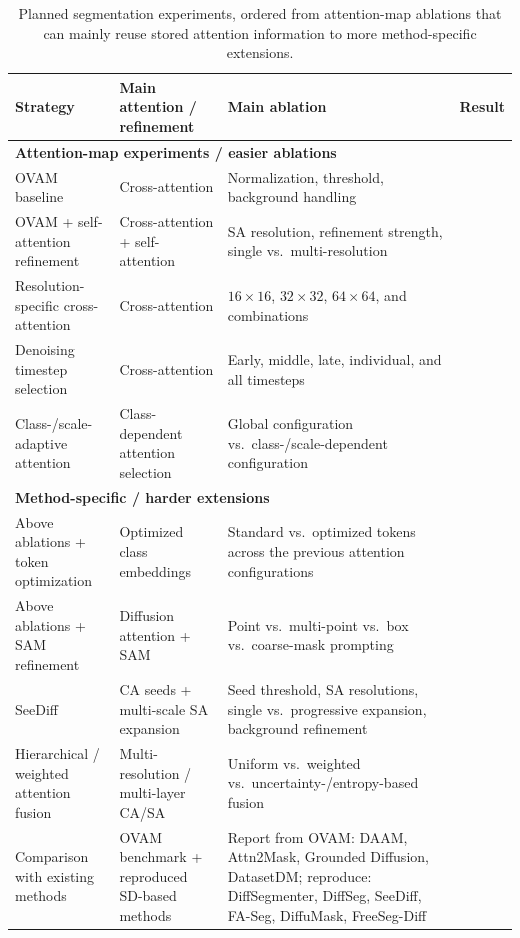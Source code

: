 \documentclass[11pt,a4paper]{article}
\begin{document}
\begin{table}[h]
\centering
\small
\begin{tabular}{p{3.2cm}p{3.0cm}p{3.6cm}p{2.1cm}}
\toprule
\textbf{Strategy} &
\textbf{Main attention / refinement} &
\textbf{Main ablation} &
\textbf{Result} \\
\midrule

\multicolumn{4}{l}{\textbf{Attention-map experiments / easier ablations}} \\
\midrule

OVAM baseline
& Cross-attention
& Normalization, threshold, background handling
& \\[1.2em]

OVAM + self-attention refinement
& Cross-attention + self-attention
& SA resolution, refinement strength, single vs.\ multi-resolution
& \\[1.2em]

Resolution-specific cross-attention
& Cross-attention
& $16\times16$, $32\times32$, $64\times64$, and combinations
& \\[1.2em]

Denoising timestep selection
& Cross-attention
& Early, middle, late, individual, and all timesteps
& \\[1.2em]

Class-/scale-adaptive attention
& Class-dependent attention selection
& Global configuration vs.\ class-/scale-dependent configuration
& \\[1.2em]

\midrule
\multicolumn{4}{l}{\textbf{Method-specific / harder extensions}} \\
\midrule

Above ablations + token optimization
& Optimized class embeddings
& Standard vs.\ optimized tokens across the previous attention configurations
& \\[1.2em]

Above ablations + SAM refinement
& Diffusion attention + SAM
& Point vs.\ multi-point vs.\ box vs.\ coarse-mask prompting
& \\[1.2em]

SeeDiff
& CA seeds + multi-scale SA expansion
& Seed threshold, SA resolutions, single vs.\ progressive expansion, background refinement
& \\[1.2em]

Hierarchical / weighted attention fusion
& Multi-resolution / multi-layer CA/SA
& Uniform vs.\ weighted vs.\ uncertainty-/entropy-based fusion
& \\[1.2em]

Comparison with existing methods
& OVAM benchmark + reproduced SD-based methods
& Report from OVAM: DAAM, Attn2Mask, Grounded Diffusion, DatasetDM; reproduce: DiffSegmenter, DiffSeg, SeeDiff, FA-Seg, DiffuMask, FreeSeg-Diff
& \\[1.2em]

\bottomrule
\end{tabular}
\caption{Planned segmentation experiments, ordered from attention-map ablations
that can mainly reuse stored attention information to more method-specific extensions.}
\end{table}
\end{document}
